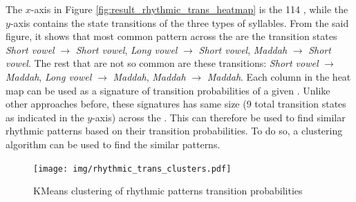 The $x$-axis in Figure \ref{fig:result_rhythmic_trans_heatmap} is the 114  , while the $y$-axis contains the state transitions of the three types of syllables. From the said figure, it shows that most common pattern across the   are the transition states \textit{Short vowel} $\rightarrow$ \textit{Short vowel}, \textit{Long vowel} $\rightarrow$ \textit{Short vowel}, \textit{Maddah} $\rightarrow$ \textit{Short vowel}. The rest that are not so common are these transitions: \textit{Short vowel} $\rightarrow$ \textit{Maddah}, \textit{Long vowel} $\rightarrow$ \textit{Maddah}, \textit{Maddah} $\rightarrow$ \textit{Maddah}. Each column in the heat map can be used as a signature of transition probabilities of a given  . Unlike other approaches before, these signatures has same size (9 total transition states as indicated in the $y$-axis) across the  . This can therefore be used to find similar rhythmic patterns based on their transition probabilities. To do so, a clustering algorithm can be used to find the similar patterns.

\begin{figure}[!t]
    \centering
    \texttt{[image: img/rhythmic\_trans\_clusters.pdf]}
    \caption{KMeans clustering of rhythmic patterns transition probabilities}
    \label{fig:result_rhythmic_trans_heatmap_clusters}
\end{figure}

